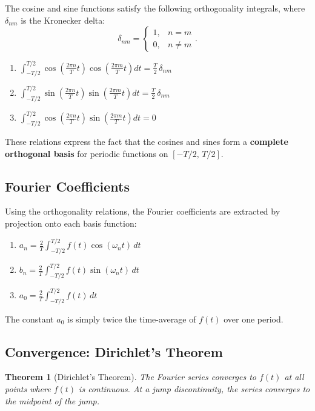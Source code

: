 \documentclass{article}
\newtheorem{theorem}{Theorem}
\begin{document}
The cosine and sine functions satisfy the following orthogonality integrals, where $\delta_{nm}$ is the Kronecker delta:
\[\delta_{nm} = \begin{cases} 1, & n = m \\ 0, & n \neq m \end{cases}.\]
\begin{enumerate}
    \item $\displaystyle\int_{-T/2}^{T/2}\cos\!\left(\tfrac{2\pi n}{T}t\right)\cos\!\left(\tfrac{2\pi m}{T}t\right)dt = \frac{T}{2}\,\delta_{nm}$
    \item $\displaystyle\int_{-T/2}^{T/2}\sin\!\left(\tfrac{2\pi n}{T}t\right)\sin\!\left(\tfrac{2\pi m}{T}t\right)dt = \frac{T}{2}\,\delta_{nm}$
    \item $\displaystyle\int_{-T/2}^{T/2}\cos\!\left(\tfrac{2\pi n}{T}t\right)\sin\!\left(\tfrac{2\pi m}{T}t\right)dt = 0$
\end{enumerate}
These relations express the fact that the cosines and sines form a \textbf{complete orthogonal basis} for periodic functions on $[-T/2,\, T/2]$.

\subsection{Fourier Coefficients}

Using the orthogonality relations, the Fourier coefficients are extracted by projection onto each basis function:
\begin{enumerate}
    \item $\displaystyle a_n = \frac{2}{T}\int_{-T/2}^{T/2} f(t)\cos(\omega_n t)\,dt$
    \item $\displaystyle b_n = \frac{2}{T}\int_{-T/2}^{T/2} f(t)\sin(\omega_n t)\,dt$
    \item $\displaystyle a_0 = \frac{2}{T}\int_{-T/2}^{T/2} f(t)\,dt$
\end{enumerate}
The constant $a_0$ is simply twice the time-average of $f(t)$ over one period.

\subsection{Convergence: Dirichlet's Theorem}

\begin{theorem}[Dirichlet's Theorem]
    The Fourier series converges to $f(t)$ at all points where $f(t)$ is continuous. At a jump discontinuity, the series converges to the midpoint of the jump.
\end{theorem}
\end{document}
